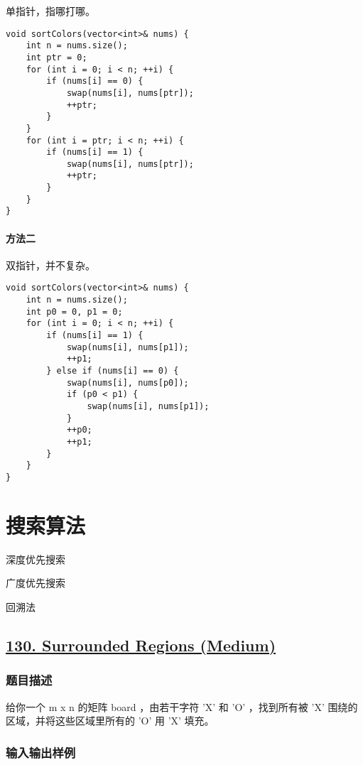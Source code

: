 \documentclass[lang=cn,10pt]{elegantbook}
\begin{document}
单指针，指哪打哪。

\begin{lstlisting}
void sortColors(vector<int>& nums) {
	int n = nums.size();
	int ptr = 0;
	for (int i = 0; i < n; ++i) {
		if (nums[i] == 0) {
			swap(nums[i], nums[ptr]);
			++ptr;
		}
	}
	for (int i = ptr; i < n; ++i) {
		if (nums[i] == 1) {
			swap(nums[i], nums[ptr]);
			++ptr;
		}
	}
}
\end{lstlisting}

\subsubsection*{方法二}

双指针，并不复杂。

\begin{lstlisting}
void sortColors(vector<int>& nums) {
	int n = nums.size();
	int p0 = 0, p1 = 0;
	for (int i = 0; i < n; ++i) {
		if (nums[i] == 1) {
			swap(nums[i], nums[p1]);
			++p1;
		} else if (nums[i] == 0) {
			swap(nums[i], nums[p0]);
			if (p0 < p1) {
				swap(nums[i], nums[p1]);
			}
			++p0;
			++p1;
		}
	}
}
\end{lstlisting}

\chapter{搜索算法}

\begin{introduction}[前情提要]
	\item 深度优先搜索
	\item 广度优先搜索
	\item 回溯法
\end{introduction}

{\color{red}\section{\href{https://leetcode.cn/problems/surrounded-regions/}{130. Surrounded Regions (Medium)}}} \label{ch6.130}

\subsection*{题目描述}

给你一个 m x n 的矩阵 board ，由若干字符 'X' 和 'O' ，找到所有被 'X' 围绕的区域，并将这些区域里所有的 'O' 用 'X' 填充。

\subsection*{输入输出样例}
\end{document}

